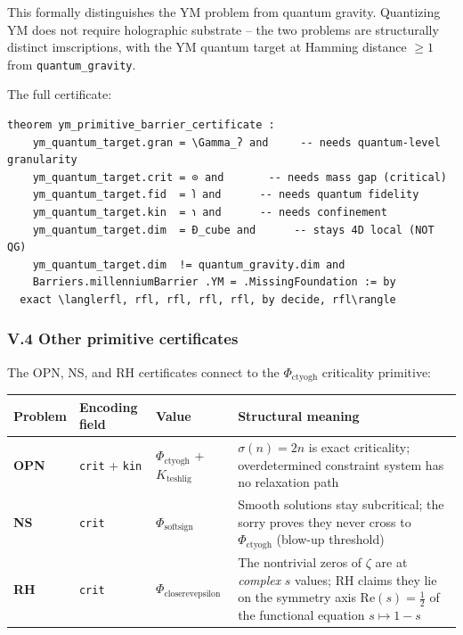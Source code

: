 \documentclass[12pt,a4paper]{article}
\begin{document}
This formally distinguishes the YM problem from quantum gravity. Quantizing YM does not require holographic substrate  --  the two problems are structurally distinct imscriptions, with the YM quantum target at Hamming distance $\geq 1$ from \texttt{quantum\_gravity}.

The full certificate:

\begin{lstlisting}[language=lean]
theorem ym_primitive_barrier_certificate :
    ym_quantum_target.gran = \Gamma_ʔ and     -- needs quantum-level granularity
    ym_quantum_target.crit = ⊙ and       -- needs mass gap (critical)
    ym_quantum_target.fid  = 𐑐 and      -- needs quantum fidelity
    ym_quantum_target.kin  = 𐑪 and      -- needs confinement
    ym_quantum_target.dim  = Ð_cube and      -- stays 4D local (NOT QG)
    ym_quantum_target.dim  != quantum_gravity.dim and
    Barriers.millenniumBarrier .YM = .MissingFoundation := by
  exact \langlerfl, rfl, rfl, rfl, rfl, by decide, rfl\rangle
\end{lstlisting}

\subsubsection{V.4 Other primitive certificates}

The OPN, NS, and RH certificates connect to the $\Phi_{\text{ctyogh}}$ criticality primitive:

\begin{table}[htbp]
\centering
\small
{}
\begin{tabularx}{\textwidth}{>{\centering\arraybackslash}X >{\centering\arraybackslash}X >{\centering\arraybackslash}X >{\centering\arraybackslash}X}
\toprule
\rowcolor{gray!25}\textbf{Problem} & \textbf{Encoding field} & \textbf{Value} & \textbf{Structural meaning} \\
\midrule
\rowcolors{1}{white}{gray!10}
\textbf{OPN} & \texttt{crit} + \texttt{kin} & $\Phi_{\text{ctyogh}}$ + $K_{\text{teshlig}}$ & $\sigma(n) = 2n$ is exact criticality; overdetermined constraint system has no relaxation path \\
\textbf{NS} & \texttt{crit} & $\Phi_{\text{softsign}}$ & Smooth solutions stay subcritical; the sorry proves they never cross to $\Phi_{\text{ctyogh}}$ (blow-up threshold) \\
\textbf{RH} & \texttt{crit} & $\Phi_{\text{closerevepsilon}}$ & The nontrivial zeros of $\zeta$ are at \emph{complex} $s$ values; RH claims they lie on the symmetry axis $\text{Re}(s)=\frac{1}{2}$ of the functional equation $s \mapsto 1-s$ \\
\bottomrule
\end{tabularx}
\end{table}
\end{document}
